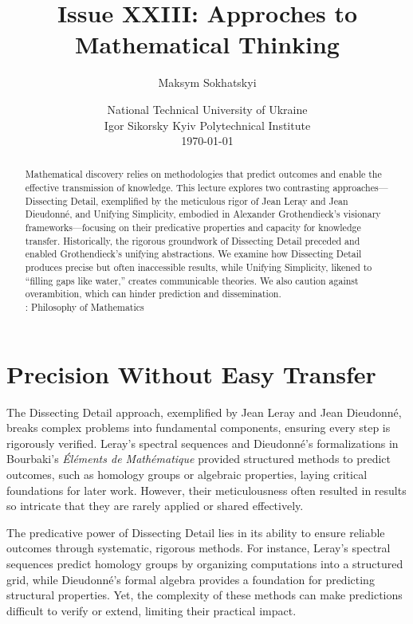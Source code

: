 \documentclass{article}
\begin{document}
\title{Issue XXIII: Approches to Mathematical Thinking}
\author{Maksym Sokhatskyi}
\date{ National Technical University of Ukraine \\
       \small Igor Sikorsky Kyiv Polytechnical Institute \\
       \today }
\maketitle

\begin{abstract}
Mathematical discovery relies on methodologies that predict outcomes and enable
the effective transmission of knowledge. This lecture explores two contrasting
approaches—Dissecting Detail, exemplified by the meticulous rigor of Jean Leray
and Jean Dieudonné, and Unifying Simplicity, embodied in Alexander Grothendieck’s
visionary frameworks—focusing on their predicative properties and capacity for
knowledge transfer. Historically, the rigorous groundwork of Dissecting Detail
preceded and enabled Grothendieck’s unifying abstractions. We examine how
Dissecting Detail produces precise but often inaccessible results, while
Unifying Simplicity, likened to “filling gaps like water,” creates communicable
theories. We also caution against overambition, which can hinder prediction and dissemination. \\
: Philosophy of Mathematics
\end{abstract}

\section{Precision Without Easy Transfer}
The Dissecting Detail approach, exemplified by Jean Leray and Jean Dieudonné, breaks complex problems into fundamental components, ensuring every step is rigorously verified. Leray’s spectral sequences and Dieudonné’s formalizations in Bourbaki’s \textit{Éléments de Mathématique} provided structured methods to predict outcomes, such as homology groups or algebraic properties, laying critical foundations for later work. However, their meticulousness often resulted in results so intricate that they are rarely applied or shared effectively.

The predicative power of Dissecting Detail lies in its ability to ensure reliable outcomes through systematic, rigorous methods. For instance, Leray’s spectral sequences predict homology groups by organizing computations into a structured grid, while Dieudonné’s formal algebra provides a foundation for predicting structural properties. Yet, the complexity of these methods can make predictions difficult to verify or extend, limiting their practical impact.
\end{document}
